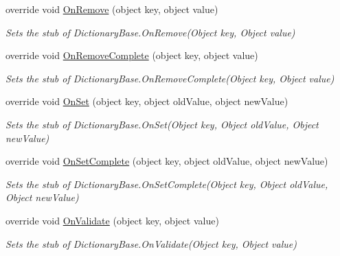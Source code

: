 \begin{DoxyCompactItemize}
override void \hyperlink{class_system_1_1_diagnostics_1_1_fakes_1_1_stub_instance_data_collection_ae390b8366c1f4e28961eba438c44cedf}{On\-Remove} (object key, object value)
\begin{DoxyCompactList}\small\item\em Sets the stub of Dictionary\-Base.\-On\-Remove(\-Object key, Object value)\end{DoxyCompactList}\item 
override void \hyperlink{class_system_1_1_diagnostics_1_1_fakes_1_1_stub_instance_data_collection_a6ae8e1979116a1fc6eae830902b55ef9}{On\-Remove\-Complete} (object key, object value)
\begin{DoxyCompactList}\small\item\em Sets the stub of Dictionary\-Base.\-On\-Remove\-Complete(\-Object key, Object value)\end{DoxyCompactList}\item 
override void \hyperlink{class_system_1_1_diagnostics_1_1_fakes_1_1_stub_instance_data_collection_a7c14f6ac3cb49d53295e61989c84c68f}{On\-Set} (object key, object old\-Value, object new\-Value)
\begin{DoxyCompactList}\small\item\em Sets the stub of Dictionary\-Base.\-On\-Set(\-Object key, Object old\-Value, Object new\-Value)\end{DoxyCompactList}\item 
override void \hyperlink{class_system_1_1_diagnostics_1_1_fakes_1_1_stub_instance_data_collection_a7abac4390f68270532850c8e7efbd3b8}{On\-Set\-Complete} (object key, object old\-Value, object new\-Value)
\begin{DoxyCompactList}\small\item\em Sets the stub of Dictionary\-Base.\-On\-Set\-Complete(\-Object key, Object old\-Value, Object new\-Value)\end{DoxyCompactList}\item 
override void \hyperlink{class_system_1_1_diagnostics_1_1_fakes_1_1_stub_instance_data_collection_a49ff4e0401f41b9c63d955b07597c115}{On\-Validate} (object key, object value)
\begin{DoxyCompactList}\small\item\em Sets the stub of Dictionary\-Base.\-On\-Validate(\-Object key, Object value)\end{DoxyCompactList}\end{DoxyCompactItemize}
